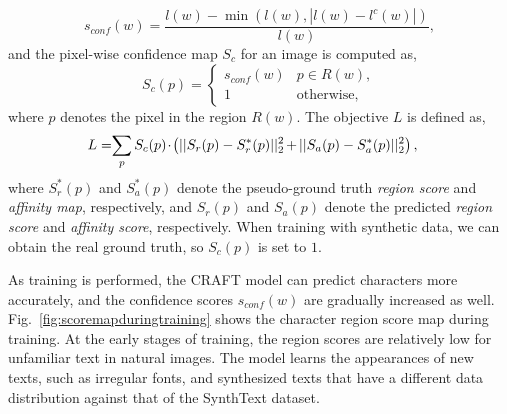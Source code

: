 \documentclass[10pt,twocolumn,letterpaper]{article}
\begin{document}
\begin{equation} \label{eq:lr}
    s_{conf}(w) = \frac{l(w) - \min(l(w), |l(w)-l^c(w)|)}{l(w)},
\end{equation}
and the pixel-wise confidence map $S_c$ for an image is computed as, 
\begin{equation}
    S_c(p) =
    \begin{cases}
      s_{conf}(w) & p \in R(w), \\
      1 & \text{otherwise},
    \end{cases}
\end{equation}
where $p$ denotes the pixel in the region $R(w)$. 
The objective $L$ is defined as,
\begin{equation} \label{eq:weighted_loss}
\begin{aligned}
L & = \hspace{-1mm} \sum_{p}S_c(p) \hspace{-0.5mm} \cdot \hspace{-0.5mm} \left( ||S_{r}(p)-S^{*}_{r}(p)||^{2}_{2} \hspace{-0.3mm} + \hspace{-0.3mm} ||S_{a}(p)-S^{*}_{a}(p)||^{2}_{2} \right),
\end{aligned}
\end{equation}
where $S_r^{*}(p)$ and $S_a^{*}(p)$ denote the pseudo-ground truth \textit{region score} and \textit{affinity map}, respectively, and $S_r(p)$ and $S_a(p)$ denote the predicted \textit{region score} and \textit{affinity score}, respectively.
When training with synthetic data, we can obtain the real ground truth, so $S_c(p)$ is set to $1$.



























As training is performed, the CRAFT model can predict characters more accurately, and the confidence scores $s_{conf}(w)$ are gradually increased as well. 
Fig.~\ref{fig:scoremapduringtraining} shows the character region score map during training. At the early stages of training, the region scores are relatively low for unfamiliar text in natural images. The model learns the appearances of new texts, such as irregular fonts, and synthesized texts that have a different data distribution against that of the SynthText dataset. 
\end{document}
